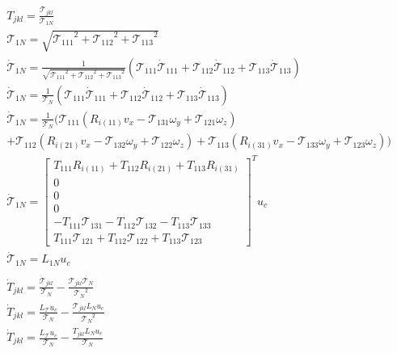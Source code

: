 \begin{equation}
  \begin{gathered}
    T_{jkl} = \frac{\mathcal{T}_{jkl}}{\mathcal{T}_{1N}}\\
    \mathcal{T}_{1N} = \sqrt{{\mathcal{T}_{111}}^{2}+{\mathcal{T}_{112}}^{2}+{\mathcal{T}_{113}}^{2}}\\
    \dot{\mathcal{T}}_{1N} = \frac{1}{\sqrt{{\mathcal{T}_{111}}^{2}+{\mathcal{T}_{112}}^{2}+{\mathcal{T}_{113}}^{2}}}(\mathcal{T}_{111}\dot{\mathcal{T}}_{111} + \mathcal{T}_{112}\dot{\mathcal{T}}_{112} + \mathcal{T}_{113}\dot{\mathcal{T}}_{113})\\
    \dot{\mathcal{T}}_{1N} = \frac{1}{\mathcal{T}_{N}}(\mathcal{T}_{111}\dot{\mathcal{T}}_{111} + \mathcal{T}_{112}\dot{\mathcal{T}}_{112} + \mathcal{T}_{113}\dot{\mathcal{T}}_{113})\\
    \dot{\mathcal{T}}_{1N} = \frac{1}{\mathcal{T}_{N}}(\mathcal{T}_{111}(R_{i(11)} v_x - \mathcal{T}_{131} \omega_y + \mathcal{T}_{121} \omega_z) \\+ \mathcal{T}_{112}(R_{i(21)} v_x - \mathcal{T}_{132} \omega_y + \mathcal{T}_{122} \omega_z) + \mathcal{T}_{113}(R_{i(31)} v_x - \mathcal{T}_{133} \omega_y + \mathcal{T}_{123} \omega_z))\\
  \dot{\mathcal{T}}_{1N} = \begin{bmatrix}T_{111}R_{i(11)} + T_{112}R_{i(21)} + T_{113}R_{i(31)} \\ 0 \\ 0 \\ 0 \\ -T_{111}\mathcal{T}_{131} - T_{112}\mathcal{T}_{132} - T_{113}\mathcal{T}_{133} \\  T_{111}\mathcal{T}_{121} + T_{112}\mathcal{T}_{122} + T_{113}\mathcal{T}_{123}\end{bmatrix}^{T} u_c\\
    \dot{\mathcal{T}}_{1N} = L_{1N} u_c\\
    \\
    \dot{T}_{jkl} = \frac{\dot{\mathcal{T}}_{jkl}}{\mathcal{T}_{N}} - \frac{\mathcal{T}_{jkl} \dot{\mathcal{T}_{N}}}{{\mathcal{T}_{N}}^{2}}\\
    \dot{T}_{jkl} = \frac{L_{\mathcal{T}} u_c}{\mathcal{T}_{N}} - \frac{\mathcal{T}_{jkl} L_{N} u_c}{{\mathcal{T}_{N}}^{2}}\\
    \dot{T}_{jkl} = \frac{L_{\mathcal{T}} u_c}{\mathcal{T}_{N}} - \frac{T_{jkl} L_{N} u_c}{{\mathcal{T}_{N}}}\\

\end{gathered}
\end{equation}
